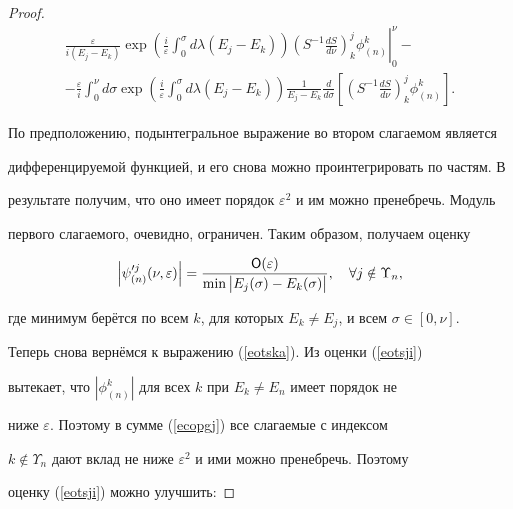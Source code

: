 \begin{proof}
\begin{multline}
  \left.\frac\varepsilon{i(E_j-E_k)}

  \exp\left(\frac i\varepsilon \int_0^\sigma \!\!\! d\lambda(E_j-E_k)\right)

  \left(S^{-1}\frac{dS}{d\nu}\right)_k^j\phi^k_{(n)}

  \right|_0^\nu-

\\

  -\frac\varepsilon i\int_0^{\nu}\!\!\! d\sigma

  \exp\left(\frac i\varepsilon \int_0^\sigma \!\!\! d\lambda(E_j-E_k)\right)

  \frac 1{E_j-E_k}\frac d{d\sigma }\left[

  \left(S^{-1}\frac{dS}{d\nu}\right)_k^j\phi^k_{(n)}\right].

\end{multline}

По предположению, подынтегральное выражение во втором слагаемом является

дифференцируемой функцией, и его снова можно проинтегрировать по частям. В

результате получим, что оно имеет порядок $\varepsilon^2$ и им можно пренебречь. Модуль

первого слагаемого, очевидно, ограничен. Таким образом, получаем оценку

\begin{equation}                                                  \label{eotsji}

  \left|\psi^{\prime j}_{(n)}(\nu,\varepsilon )\right|=

  \frac{{\sf O}(\varepsilon )}{\min\big|E_j(\sigma )-E_k(\sigma )\big|},\quad \forall j\notin\Upsilon_n,

\end{equation}

где минимум берётся по всем $k$, для которых $E_k\ne E_j$, и всем $\sigma \in[0,\nu]$.



Теперь снова вернёмся к выражению (\ref{eotska}). Из оценки (\ref{eotsji})

вытекает, что $|\phi_{(n)}^k|$ для всех $k$ при $E_k\ne E_n$ имеет порядок не

ниже $\varepsilon $. Поэтому в сумме (\ref{ecopgj}) все слагаемые с индексом

$k\notin\Upsilon_n$ дают вклад не ниже $\varepsilon^2$ и ими можно пренебречь. Поэтому

оценку (\ref{eotsji}) можно улучшить:


\end{proof}
